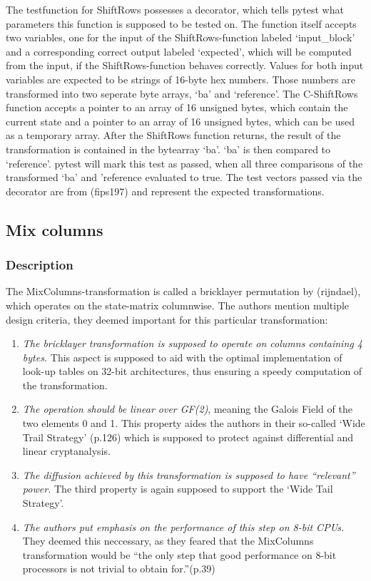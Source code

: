 The testfunction for ShiftRows possesses a decorator, which tells pytest
what parameters this function is supposed to be tested on. The function
itself accepts two variables, one for the input of the
ShiftRows-function labeled `input\_block' and a corresponding correct
output labeled `expected', which will be computed from the input, if the
ShiftRows-function behaves correctly. Values for both input variables
are expected to be strings of 16-byte hex numbers. Those numbers are
transformed into two seperate byte arrays, `ba' and `reference'. The
C-ShiftRows function accepts a pointer to an array of 16 unsigned bytes,
which contain the current state and a pointer to an array of 16 unsigned
bytes, which can be used as a temporary array. After the ShiftRows
function returns, the result of the transformation is contained in the
bytearray `ba'. `ba' is then compared to `reference'. pytest will mark
this test as passed, when all three comparisons of the transformed `ba'
and 'reference evaluated to true. The test vectors passed via the
decorator are from (fips197) and represent the expected transformations.

\hypertarget{mix-columns}{%
\subsection{Mix columns}\label{mix-columns}}

\hypertarget{description-4}{%
\subsubsection{Description}\label{description-4}}

The MixColumns-transformation is called a bricklayer permutation by
(rijndael), which operates on the state-matrix columnwise. The authors
mention multiple design criteria, they deemed important for this
particular transformation:

\begin{enumerate}
\def\labelenumi{\arabic{enumi}.}

\item
  \emph{The bricklayer transformation is supposed to operate on columns
  containing 4 bytes.} This aspect is supposed to aid with the optimal
  implementation of look-up tables on 32-bit architectures, thus
  ensuring a speedy computation of the transformation.
\item
  \emph{The operation should be linear over GF(2)}, meaning the Galois
  Field of the two elements 0 and 1. This property aides the authors in
  their so-called `Wide Trail Strategy' (p.126) which is supposed to
  protect against differential and linear cryptanalysis.
\item
  \emph{The diffusion achieved by this transformation is supposed to
  have ``relevant'' power.} The third property is again supposed to
  support the `Wide Tail Strategy'.
\item
  \emph{The authors put emphasis on the performance of this step on 8-bit
  CPUs.} They deemed this neccessary, as they feared that the MixColumns
  transformation would be ``the only step that good performance on 8-bit
  processors is not trivial to obtain for.''(p.39)
\end{enumerate}


